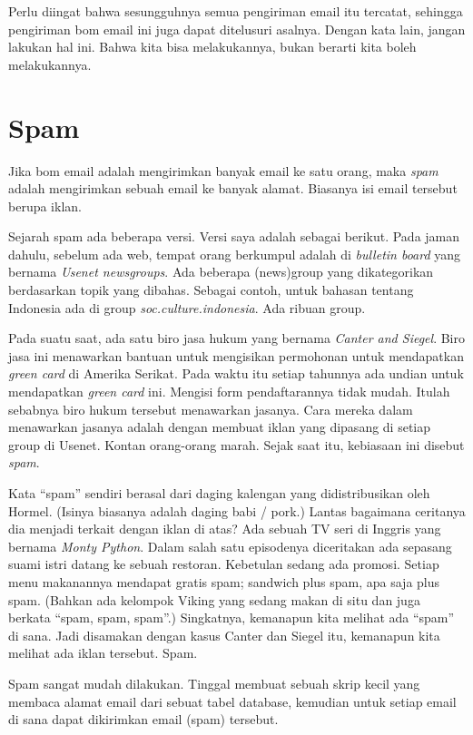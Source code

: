 Perlu diingat bahwa sesungguhnya semua pengiriman email itu tercatat, sehingga
pengiriman bom email ini juga dapat ditelusuri asalnya. Dengan kata lain,
jangan lakukan hal ini. Bahwa kita bisa melakukannya, bukan berarti kita boleh
melakukannya.

\section{Spam}
Jika bom email adalah mengirimkan banyak email ke satu orang, maka {\em spam}
adalah mengirimkan sebuah email ke banyak alamat. Biasanya isi email tersebut
berupa iklan.

Sejarah spam ada beberapa versi. Versi saya adalah sebagai berikut. Pada jaman
dahulu, sebelum ada web, tempat orang berkumpul adalah di {\em bulletin board}
yang bernama {\em Usenet newsgroups}. Ada beberapa (news)group yang
dikategorikan berdasarkan topik yang dibahas. Sebagai contoh, untuk bahasan
tentang Indonesia ada di group {\em soc.culture.indonesia}. Ada ribuan group.

Pada suatu saat, ada satu biro jasa hukum yang bernama {\em Canter and Siegel}.
Biro jasa ini menawarkan bantuan untuk mengisikan permohonan untuk mendapatkan
{\em green card} di Amerika Serikat. Pada waktu itu setiap tahunnya ada undian
untuk mendapatkan {\em green card} ini. Mengisi form pendaftarannya tidak
mudah. Itulah sebabnya biro hukum tersebut menawarkan jasanya. Cara mereka
dalam menawarkan jasanya adalah dengan membuat iklan yang dipasang di setiap
group di Usenet. Kontan orang-orang marah. Sejak saat itu, kebiasaan ini
disebut {\em spam}.

Kata ``spam'' sendiri berasal dari daging kalengan yang didistribusikan oleh
Hormel. (Isinya biasanya adalah daging babi / pork.) Lantas bagaimana ceritanya
dia menjadi terkait dengan iklan di atas? Ada sebuah TV seri di Inggris yang
bernama {\em Monty Python}. Dalam salah satu episodenya diceritakan ada
sepasang suami istri datang ke sebuah restoran. Kebetulan sedang ada promosi.
Setiap menu makanannya mendapat gratis spam; sandwich plus spam, apa saja plus
spam. (Bahkan ada kelompok Viking yang sedang makan di situ dan juga berkata
``spam, spam, spam''.) Singkatnya, kemanapun kita melihat ada ``spam'' di sana.
Jadi disamakan dengan kasus Canter dan Siegel itu, kemanapun kita melihat ada
iklan tersebut. Spam.

Spam sangat mudah dilakukan. Tinggal membuat sebuah skrip kecil yang membaca
alamat email dari sebuat tabel database, kemudian untuk setiap email di sana
dapat dikirimkan email (spam) tersebut.
